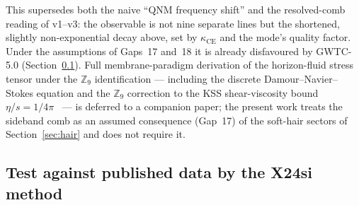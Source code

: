 \documentclass[11pt,a4paper]{article}
\begin{document}
This supersedes both the naive ``QNM frequency shift'' and the resolved-comb
reading of v1--v3: the observable is not nine separate lines but the shortened,
slightly non-exponential decay above, set by $\kappa_{\mathrm{CE}}$ and the mode's
quality factor. Under the assumptions of Gaps~17 and~18 it is already
disfavoured by GWTC-5.0 (Section~\ref{sec:x24si_test}). Full membrane-paradigm derivation of the
horizon-fluid stress tensor under the $\mathbb{Z}_9$ identification — including
the discrete Damour--Navier--Stokes equation and the $\mathbb{Z}_9$ correction
to the KSS shear-viscosity bound $\eta/s = 1/4\pi$~\cite{KSS2005} — is
deferred to a companion paper; the present work treats the sideband comb as
an assumed consequence (Gap~17) of the soft-hair sectors of Section~\ref{sec:hair}
and does not require it.

\subsection{Test against published data by the X24si method}
\label{sec:x24si_test}
\end{document}

